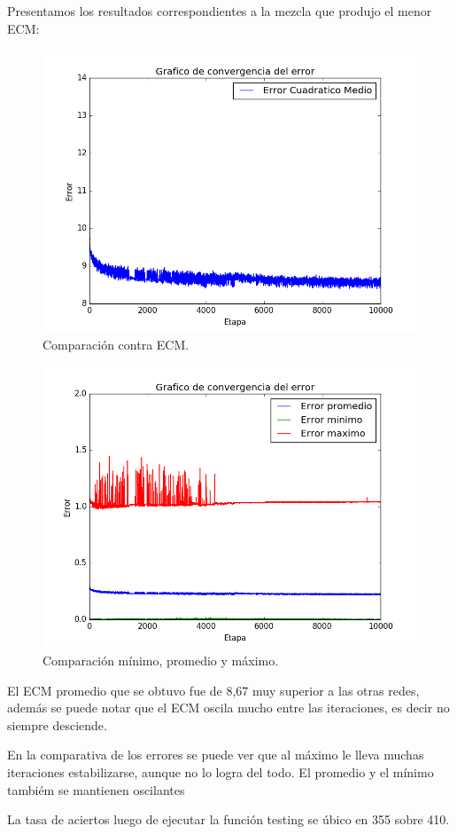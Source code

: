 \documentclass[onecolumn,10pt]{article}
\begin{document}
Presentamos los resultados correspondientes a la mezcla que produjo
el menor ECM:

\begin{figure}[H]
  \centering
  \includegraphics[width=0.7\columnwidth]{red_4_ecm.png}
  \caption{Comparación contra ECM.}
  \label{fig:red 4 ECM}
\end{figure}


\begin{figure}[H]
  \centering
  \includegraphics[width=0.7\columnwidth]{red_4_prom.png}
  \caption{Comparación mínimo, promedio y máximo.}
  \label{fig:red promedios}
\end{figure}

El ECM promedio que se obtuvo fue de 8,67 muy superior a las otras redes, además se
puede notar que el ECM oscila mucho entre las iteraciones, es decir no siempre desciende.

En la comparativa de los errores se puede ver que al máximo le lleva muchas iteraciones
estabilizarse, aunque no lo logra del todo. El promedio y el mínimo tambiém se mantienen
oscilantes

La tasa de aciertos luego de ejecutar la función testing se úbico en 355 sobre 410.
\end{document}

